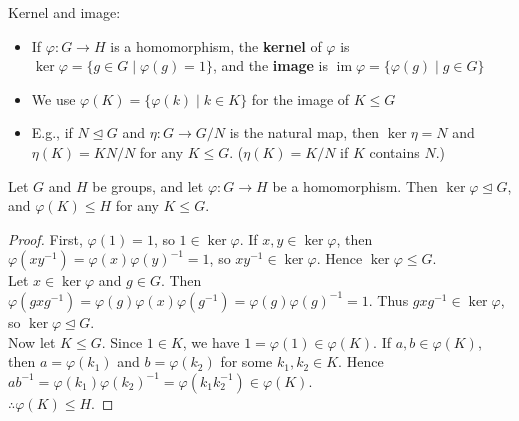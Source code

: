 \documentclass[../Odyssey_Project.tex]{subfiles}
\begin{document}
\noindent Kernel and image:
\begin{itemize}
    \item If \(\varphi : G \to H\) is a homomorphism, the \textbf{kernel} of \(\varphi\) is \(\ker \varphi = \{g \in G \mid \varphi(g) = 1\}\), and the \textbf{image} is \(\operatorname{im} \varphi = \{\varphi(g) \mid g \in G\}\)
    \item We use \(\varphi(K) = \{\varphi(k) \mid k \in K\}\) for the image of \(K \leq G\)
    \item E.g., if \(N \trianglelefteq G\) and \(\eta : G \to G/N\) is the natural map, then \(\ker \eta = N\) and \(\eta(K) = KN/N\) for any \(K \leq G\). (\(\eta(K) = K/N\) if \(K\) contains \(N\).)
\end{itemize}
\begin{proposition}
\label{prop:1.11}
Let $G$ and $H$ be groups, and let $\varphi : G \to H$ be a homomorphism. Then $\ker \varphi \trianglelefteq G$, and $\varphi(K) \leq H$ for any $K \leq G$.
\end{proposition}
\begin{proof}
    First, \(\varphi(1) = 1\), so \(1 \in \ker \varphi\). If \(x,y \in \ker \varphi\), then \(\varphi(xy^{-1}) = \varphi(x)\varphi(y)^{-1} = 1\), so \(xy^{-1} \in \ker \varphi\). Hence \(\ker \varphi \leq G\). \\
    Let \(x \in \ker \varphi\) and \(g \in G\). Then \(\varphi(gxg^{-1}) = \varphi(g)\varphi(x)\varphi(g^{-1}) = \varphi(g)\varphi(g)^{-1} = 1\). Thus \(gxg^{-1} \in \ker \varphi\), so \(\ker \varphi \trianglelefteq G\). \\
    Now let \(K \leq G\). Since \(1 \in K\), we have \(1 = \varphi(1) \in \varphi(K)\). If \(a,b \in \varphi(K)\), then \(a = \varphi(k_1)\) and \(b = \varphi(k_2)\) for some \(k_1,k_2 \in K\). Hence \(ab^{-1} = \varphi(k_1)\varphi(k_2)^{-1} = \varphi(k_1k_2^{-1}) \in \varphi(K)\). \\
    \(\therefore \varphi(K) \leq H\).
\end{proof}
\end{document}
